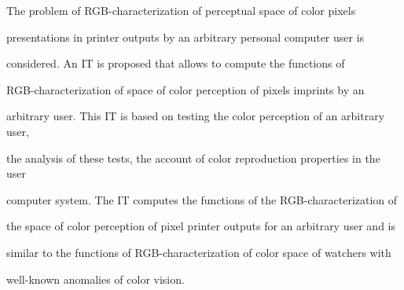 









 \titelee{\tit}{\aut} %












\noindent


The problem of RGB-characterization of perceptual space of color pixels


presentations in printer outputs by an arbitrary personal computer user is


considered. An IT is proposed that allows to compute the functions of


RGB-characterization of space of color perception of pixels imprints by an


arbitrary user. This IT is based on testing the color perception of an arbitrary user,


the analysis of these tests, the account of color reproduction properties in the user


computer system. The IT computes the functions of the RGB-characterization of


the space of color perception of pixel printer outputs for an arbitrary user and is


similar to the functions of RGB-characterization of color space of watchers with


well-known anomalies of color vision.















